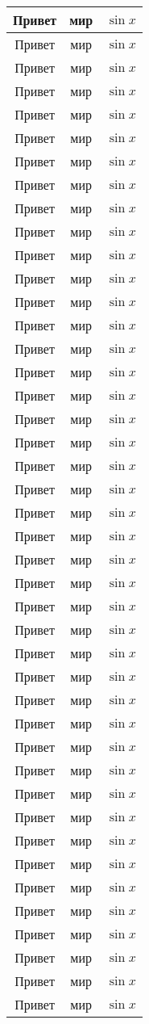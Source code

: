 \documentclass[a4paper,12pt, landscape]{report}
\begin{document}
\begin{center}
\begin{longtable}{|c||c||c|}
\hline
Привет & мир & $\sin x$ \\
\hline
Привет & мир & $\sin x$ \\
\hline
Привет & мир & $\sin x$ \\
\hline
Привет & мир & $\sin x$ \\
\hline
Привет & мир & $\sin x$ \\
\hline
Привет & мир & $\sin x$ \\
\hline
Привет & мир & $\sin x$ \\
\hline
Привет & мир & $\sin x$ \\
\hline
Привет & мир & $\sin x$ \\
\hline
Привет & мир & $\sin x$ \\
\hline
Привет & мир & $\sin x$ \\
\hline
Привет & мир & $\sin x$ \\
\hline
Привет & мир & $\sin x$ \\
\hline
Привет & мир & $\sin x$ \\
\hline
Привет & мир & $\sin x$ \\
\hline
Привет & мир & $\sin x$ \\
\hline
Привет & мир & $\sin x$ \\
\hline
Привет & мир & $\sin x$ \\
\hline
Привет & мир & $\sin x$ \\
\hline
Привет & мир & $\sin x$ \\
\hline
Привет & мир & $\sin x$ \\
\hline
Привет & мир & $\sin x$ \\
\hline
Привет & мир & $\sin x$ \\
\hline
Привет & мир & $\sin x$ \\
\hline
Привет & мир & $\sin x$ \\
\hline
Привет & мир & $\sin x$ \\
\hline
Привет & мир & $\sin x$ \\
\hline
Привет & мир & $\sin x$ \\
\hline
Привет & мир & $\sin x$ \\
\hline
Привет & мир & $\sin x$ \\
\hline
Привет & мир & $\sin x$ \\
\hline
Привет & мир & $\sin x$ \\
\hline
Привет & мир & $\sin x$ \\
\hline
Привет & мир & $\sin x$ \\
\hline
Привет & мир & $\sin x$ \\
\hline
Привет & мир & $\sin x$ \\
\hline
Привет & мир & $\sin x$ \\
\hline
Привет & мир & $\sin x$ \\
\hline
Привет & мир & $\sin x$ \\
\hline
Привет & мир & $\sin x$ \\
\hline
Привет & мир & $\sin x$ \\
\hline
Привет & мир & $\sin x$ \\
\hline
Привет & мир & $\sin x$ \\
\hline
\end{longtable}
\end{center}
\end{document}
